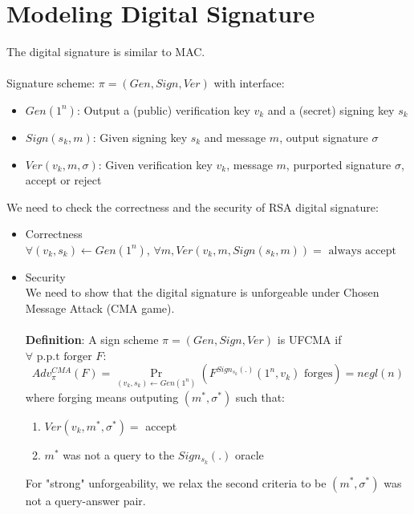 \documentclass{scribe}
\begin{document}
\section{Modeling Digital Signature}
The digital signature is similar to MAC.
\\\\
Signature scheme: $\pi = (Gen, Sign, Ver)$ with interface:
\begin{itemize}
    \item $Gen(1^n)$: Output a (public) verification key $v_k$ and a (secret) signing key $s_k$
    \item $Sign(s_k,m)$: Given signing key $s_k$ and message $m$, output signature $\sigma$
    \item $Ver(v_k,m,\sigma)$: Given verification key $v_k$, message $m$,  purported signature $\sigma$, accept or reject
\end{itemize}
\vspace{5mm}
We need to check the correctness and the security of RSA digital signature:
\begin{itemize}
    \item Correctness\\
            $\forall (v_k,s_k) \leftarrow Gen(1^n)$, $\forall m, Ver(v_k,m,Sign(s_k,m))=\text{ always accept}$
    \item Security\\
            We need to show that the digital signature is unforgeable under Chosen Message Attack (CMA game).\\\\
            \textbf{Definition}: A sign scheme $\pi = (Gen,Sign,Ver)$ is UFCMA if $\forall \text{ p.p.t forger } F$:
            \[Adv_{\pi}^{CMA}(F) = \Pr_{(v_k,s_k) \leftarrow Gen(1^n)}(F^{Sign_{s_k}(.)}(1^n,v_k) \text{ forges}) = negl(n) \]
            where forging means outputing $(m^*,\sigma^*)$ such that:
            \begin{enumerate}
                \item $Ver(v_k,m^*,\sigma^*) = $ accept
                \item $m^*$ was not a query to the $Sign_{s_k}(.)$ oracle
            \end{enumerate}
            For "strong" unforgeability, we relax the second criteria to be $(m^*,\sigma^*)$ was not a query-answer pair.  
\end{itemize}

\vspace{10mm}
\end{document}
